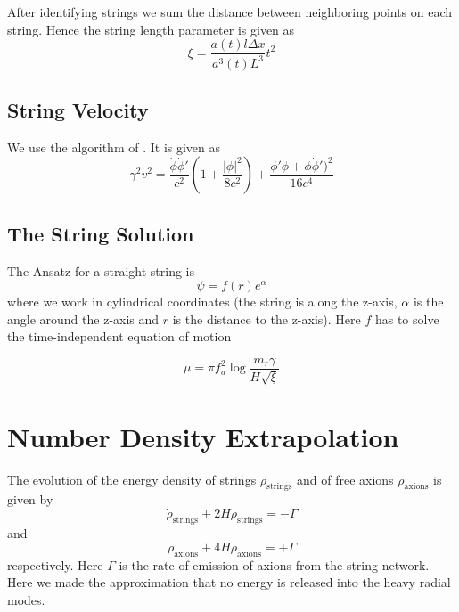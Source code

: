 \documentclass[a4paper]{article}
\begin{document}
After identifying strings we sum the distance between neighboring points on each string. Hence the string length parameter is given as 
\begin{equation}
	\xi = \frac{a(t) l \Delta x}{a^3(t) L^3} t^2
\end{equation}

\subsection{String Velocity}
We use the algorithm of \cite[appendix A.2, eq. A.10]{axion_dark_matter_strings_and_their_cores}.
It is given as
\begin{equation}
	\gamma^2 v^2 = \frac{\dot{\phi} \dot{\phi}'}{c^2} \left(1 + \frac{|\phi|^2}{8 c^2} \right) + \frac{\phi' \dot{\phi} + \phi \dot{\phi}')^2}{16 c^4}
\end{equation}
 
\subsection{The String Solution}

The Ansatz for a straight string is
\begin{equation}
	\psi = f(r) e^{\alpha}
\end{equation}
where we work in cylindrical coordinates (the string is along the z-axis, $\alpha$ is the angle around the z-axis and $r$ is the distance to the z-axis).
Here $f$ has to solve the time-independent equation of motion


\begin{equation}
	\mu = \pi f_a^2 \log \frac{m_r \gamma}{H \sqrt{\xi}}
\end{equation}

\newpage
\section{Number Density Extrapolation}

The evolution of the energy density of strings $\rho_\mathrm{strings}$
and of free axions $\rho_\mathrm{axions}$ is given by
\begin{equation}
	\label{eq:string_energy_eom}
	\dot{\rho}_\mathrm{strings} + 2 H \rho_\mathrm{strings} = - \Gamma
\end{equation}
and
\begin{equation}
	\label{eq:axion_energy_eom}
	\dot{\rho}_\mathrm{axions} + 4 H \rho_\mathrm{axions} = + \Gamma
\end{equation}
respectively.
Here $\Gamma$ is the rate of emission of axions from the string network.
Here we made the approximation that no energy is released into the heavy radial modes. 
\end{document}
